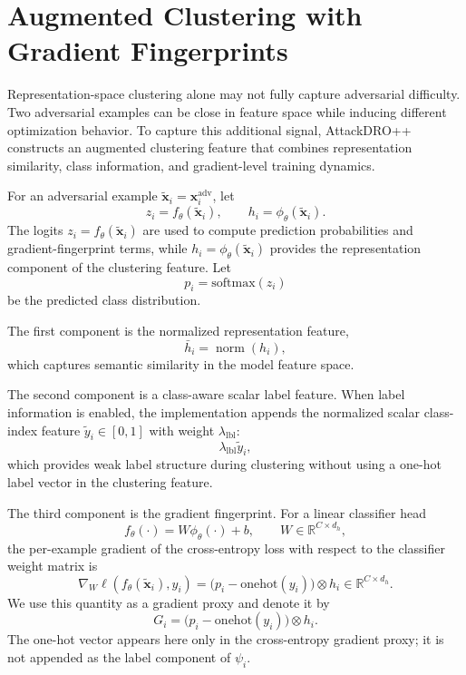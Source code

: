 \section{Augmented Clustering with Gradient Fingerprints}
\label{sec:ch4_gradfp}

Representation-space clustering alone may not fully capture adversarial difficulty.
Two adversarial examples can be close in feature space while inducing different
optimization behavior. To capture this additional signal, AttackDRO++ constructs
an augmented clustering feature that combines representation similarity, class
information, and gradient-level training dynamics.

For an adversarial example \(\tilde{\mathbf{x}}_i=\mathbf{x}_i^{\mathrm{adv}}\), let
\[
z_i = f_\theta(\tilde{\mathbf{x}}_i),
\qquad
h_i = \phi_\theta(\tilde{\mathbf{x}}_i).
\]
The logits \(z_i=f_\theta(\tilde{\mathbf{x}}_i)\) are used to compute prediction
probabilities and gradient-fingerprint terms, while
\(h_i=\phi_\theta(\tilde{\mathbf{x}}_i)\) provides the representation component of
the clustering feature. Let
\[
p_i = \mathrm{softmax}(z_i)
\]
be the predicted class distribution.

The first component is the normalized representation feature,
\[
\bar{h}_i = \operatorname{norm}(h_i),
\]
which captures semantic similarity in the model feature space.

The second component is a class-aware scalar label feature. When label information
is enabled, the implementation appends the normalized scalar class-index feature
\(\tilde{y}_i \in [0,1]\) with weight \(\lambda_{\mathrm{lbl}}\):
\[
\lambda_{\mathrm{lbl}}\tilde{y}_i,
\]
which provides weak label structure during clustering without using a one-hot label
vector in the clustering feature.

The third component is the gradient fingerprint. For a linear classifier head
\[
f_\theta(\cdot) = W\phi_\theta(\cdot) + b,
\qquad
W \in \mathbb{R}^{C \times d_h},
\]
the per-example gradient of the cross-entropy loss with respect to the classifier
weight matrix is
\[
\nabla_W \ell(f_\theta(\tilde{\mathbf{x}}_i),y_i)
=
\bigl(p_i-\mathrm{onehot}(y_i)\bigr)\otimes h_i
\in \mathbb{R}^{C\times d_h}.
\]
We use this quantity as a gradient proxy and denote it by
\[
G_i =
\bigl(p_i-\mathrm{onehot}(y_i)\bigr)\otimes h_i.
\]
The one-hot vector appears here only in the cross-entropy gradient proxy; it is
not appended as the label component of \(\psi_i\).

